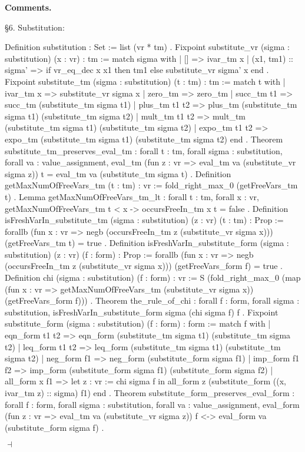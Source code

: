 \documentclass[12pt]{paper}
\newenvironment{context}[1][]
{ \noindent \textbf{{#1}.}
}
{ \hfill $ \dashv $
}
\begin{document}
\begin{context}[Comments]
    \S6. Substitution:
    \begin{coqcode}
Definition substitution : Set :=
  list (vr * tm)
.
Fixpoint substitute_vr (sigma : substitution) (x : vr) : tm :=
  match sigma with
  | [] => ivar_tm x
  | (x1, tm1) :: sigma' => if vr_eq_dec x x1 then tm1 else substitute_vr sigma' x
  end
.
Fixpoint substitute_tm (sigma : substitution) (t : tm) : tm :=
  match t with
  | ivar_tm x => substitute_vr sigma x
  | zero_tm => zero_tm
  | succ_tm t1 => succ_tm (substitute_tm sigma t1)
  | plus_tm t1 t2 => plus_tm (substitute_tm sigma t1) (substitute_tm sigma t2)
  | mult_tm t1 t2 => mult_tm (substitute_tm sigma t1) (substitute_tm sigma t2)
  | expo_tm t1 t2 => expo_tm (substitute_tm sigma t1) (substitute_tm sigma t2)
  end
.
Theorem substitute_tm_preserves_eval_tm :
  forall t : tm,
  forall sigma : substitution,
  forall va : value_assignment,
  eval_tm (fun z : vr => eval_tm va (substitute_vr sigma z)) t = eval_tm va (substitute_tm sigma t)
.
Definition getMaxNumOfFreeVars_tm (t : tm) : vr :=
  fold_right_max_0 (getFreeVars_tm t)
.
Lemma getMaxNumOfFreeVars_tm_lt :
  forall t : tm,
  forall x : vr,
  getMaxNumOfFreeVars_tm t < x ->
  occursFreeIn_tm x t = false
.
Definition isFreshVarIn_substitute_tm (sigma : substitution) (z : vr) (t : tm) : Prop :=
  forallb (fun x : vr => negb (occursFreeIn_tm z (substitute_vr sigma x))) (getFreeVars_tm t) = true
.
Definition isFreshVarIn_substitute_form (sigma : substitution) (z : vr) (f : form) : Prop :=
  forallb (fun x : vr => negb (occursFreeIn_tm z (substitute_vr sigma x))) (getFreeVars_form f) = true
.
Definition chi (sigma : substitution) (f : form) : vr :=
  S (fold_right_max_0 (map (fun x : vr => getMaxNumOfFreeVars_tm (substitute_vr sigma x)) (getFreeVars_form f)))
.
Theorem the_rule_of_chi :
  forall f : form,
  forall sigma : substitution,
  isFreshVarIn_substitute_form sigma (chi sigma f) f
.
Fixpoint substitute_form (sigma : substitution) (f : form) : form :=
  match f with
  | eqn_form t1 t2 => eqn_form (substitute_tm sigma t1) (substitute_tm sigma t2)
  | leq_form t1 t2 => leq_form (substitute_tm sigma t1) (substitute_tm sigma t2)
  | neg_form f1 => neg_form (substitute_form sigma f1)
  | imp_form f1 f2 => imp_form (substitute_form sigma f1) (substitute_form sigma f2)
  | all_form x f1 =>
    let z : vr := chi sigma f in
    all_form z (substitute_form ((x, ivar_tm z) :: sigma) f1)
  end
.
Theorem substitute_form_preserves_eval_form :
  forall f : form,
  forall sigma : substitution,
  forall va : value_assignment,
  eval_form (fun z : vr => eval_tm va (substitute_vr sigma z)) f <-> eval_form va (substitute_form sigma f)
.
    \end{coqcode}


\end{context}
\end{document}
